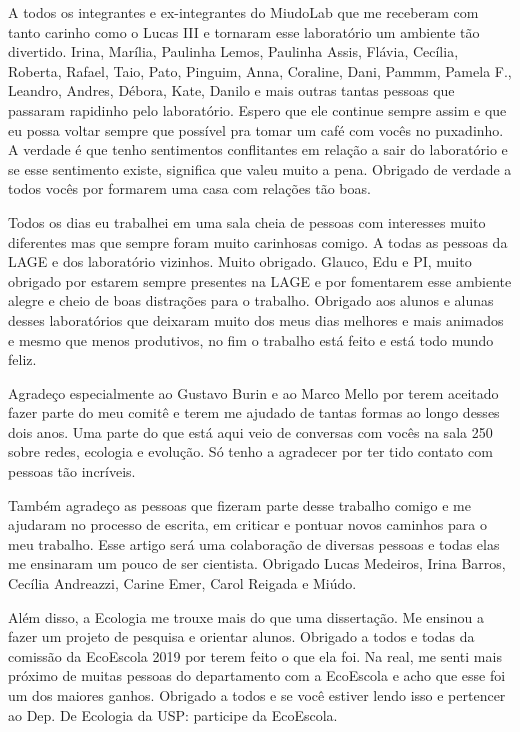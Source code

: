\documentclass[a4paper, 12pt]{article}
\begin{document}
A todos os integrantes e ex-integrantes do MiudoLab que me receberam com tanto carinho como o Lucas III e tornaram esse laboratório um ambiente tão divertido. Irina, Marília, Paulinha Lemos, Paulinha Assis, Flávia, Cecília, Roberta, Rafael, Taio, Pato, Pinguim, Anna, Coraline, Dani, Pammm, Pamela F., Leandro, Andres, Débora, Kate, Danilo e mais outras tantas pessoas que passaram rapidinho pelo laboratório. Espero que ele continue sempre assim e que eu possa voltar sempre que possível pra tomar um café com vocês no puxadinho. A verdade é que tenho sentimentos conflitantes em relação a sair do laboratório e se esse sentimento existe, significa que valeu muito a pena. Obrigado de verdade a todos vocês por formarem uma casa com relações tão boas.

Todos os dias eu trabalhei em uma sala cheia de pessoas com interesses muito diferentes mas que sempre foram muito carinhosas comigo. A todas as pessoas da LAGE e dos laboratório vizinhos. Muito obrigado. Glauco, Edu e PI, muito obrigado por estarem sempre presentes na LAGE e por fomentarem esse ambiente alegre e cheio de boas distrações para o trabalho. Obrigado aos alunos e alunas desses laboratórios que deixaram muito dos meus dias melhores e mais animados e mesmo que menos produtivos, no fim o trabalho está feito e está todo mundo feliz.

Agradeço especialmente ao Gustavo Burin e ao Marco Mello por terem aceitado fazer parte do meu comitê e terem me ajudado de tantas formas ao longo desses dois anos. Uma parte do que está aqui veio de conversas com vocês na sala 250 sobre redes, ecologia e evolução. Só tenho a agradecer por ter tido contato com pessoas tão incríveis.

Também agradeço as pessoas que fizeram parte desse trabalho comigo e me ajudaram no processo de escrita, em criticar  e pontuar novos caminhos para o meu trabalho. Esse artigo será uma colaboração de diversas pessoas e todas elas me ensinaram um pouco de ser cientista. Obrigado Lucas Medeiros, Irina Barros, Cecília Andreazzi, Carine Emer, Carol Reigada e Miúdo.

Além disso, a Ecologia me trouxe mais do que uma dissertação. Me ensinou a fazer um projeto de pesquisa e orientar alunos. Obrigado a todos e todas da comissão da EcoEscola 2019 por terem feito o que ela foi. Na real, me senti mais próximo de muitas pessoas do departamento com a EcoEscola e acho que esse foi um dos maiores ganhos. Obrigado a todos e se você estiver lendo isso e pertencer ao Dep. De Ecologia da USP: participe da EcoEscola. 
\end{document}

